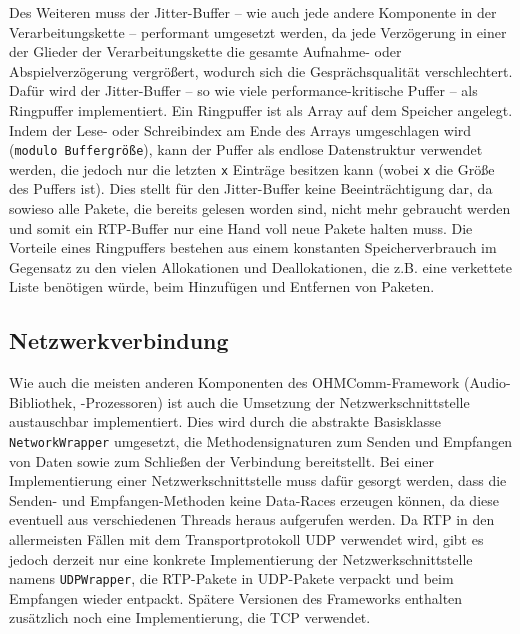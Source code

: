 Des Weiteren muss der Jitter-Buffer -- wie auch jede andere Komponente in der Verarbeitungskette -- performant umgesetzt werden, da jede Verzögerung in einer der Glieder der Verarbeitungskette die gesamte Aufnahme- oder Abspielverzögerung vergrößert, wodurch sich die Gesprächsqualität verschlechtert. Dafür wird der Jitter-Buffer -- so wie viele performance-kritische Puffer -- als Ringpuffer implementiert. Ein Ringpuffer ist als Array auf dem Speicher angelegt. Indem der Lese- oder Schreibindex am Ende des Arrays umgeschlagen wird (\texttt{modulo Buffergröße}), kann der Puffer als endlose Datenstruktur verwendet werden, die jedoch nur die letzten \texttt{x} Einträge besitzen kann (wobei \texttt{x} die Größe des Puffers ist). Dies stellt für den Jitter-Buffer keine Beeinträchtigung dar, da sowieso alle Pakete, die bereits gelesen worden sind, nicht mehr gebraucht werden und somit ein RTP-Buffer nur eine Hand voll neue Pakete halten muss. Die Vorteile eines Ringpuffers bestehen aus einem konstanten Speicherverbrauch im Gegensatz zu den vielen Allokationen und Deallokationen, die z.B. eine verkettete Liste benötigen würde, beim Hinzufügen und Entfernen von Paketen.
\subsection{Netzwerkverbindung}
Wie auch die meisten anderen Komponenten des OHMComm-Framework (Audio-Bibliothek, -Prozessoren) ist auch die Umsetzung der Netzwerkschnittstelle austauschbar implementiert. Dies wird durch die abstrakte Basisklasse \texttt{NetworkWrapper} umgesetzt, die Methodensignaturen zum Senden und Empfangen von Daten sowie zum Schließen der Verbindung bereitstellt. Bei einer Implementierung einer Netzwerkschnittstelle muss dafür gesorgt werden, dass die Senden- und Empfangen-Methoden keine Data-Races erzeugen können, da diese eventuell aus verschiedenen Threads heraus aufgerufen werden. Da RTP in den allermeisten Fällen mit dem Transportprotokoll UDP verwendet wird, gibt es jedoch derzeit nur eine konkrete Implementierung der Netzwerkschnittstelle namens \texttt{UDPWrapper}, die RTP-Pakete in UDP-Pakete verpackt und beim Empfangen wieder entpackt. Spätere Versionen des Frameworks enthalten zusätzlich noch eine Implementierung, die TCP verwendet.

\FloatBarrier
